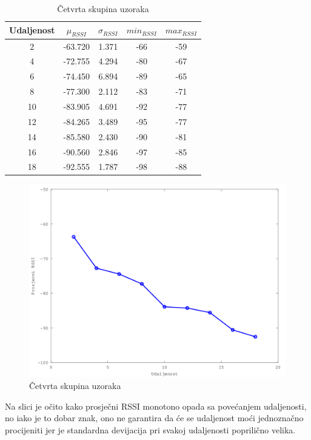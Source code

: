 \begin{table}[H]
    \centering
    \caption{Četvrta skupina uzoraka}
    \label{tbl:velikaUdaljenost}
    \begin{tabular}{ccccc}
    \hline 
    Udaljenost & $\mu_{RSSI}$ & $\sigma_{RSSI}$ & $min_{RSSI}$ & $max_{RSSI}$ \\ 
    \hline 
    2 & -63.720 & 1.371 & -66 & -59 \\ 
    4 & -72.755 & 4.294 & -80 & -67 \\ 
    6 & -74.450 & 6.894 & -89 & -65 \\ 
    8 & -77.300 & 2.112 & -83 & -71 \\ 
    10 & -83.905 & 4.691 & -92 & -77 \\ 
    12 & -84.265 & 3.489 & -95 & -77 \\ 
    14 & -85.580 & 2.430 & -90 & -81 \\ 
    16 & -90.560 & 2.846 & -97 & -85 \\ 
    18 & -92.555 & 1.787 & -98 & -88 \\ 
    \hline 
    \end{tabular} 
\end{table}

\begin{figure}[H]
    \centering
    \includegraphics[scale=0.62]{pictures/cetvrta-skupina-uzoraka}
    \caption{Četvrta skupina uzoraka}
    \label{fig:velikaUdaljenost}
\end{figure}

Na slici je očito kako prosječni RSSI monotono opada sa povećanjem udaljenosti, no iako je to dobar znak, ono ne garantira da će se udaljenost moći jednoznačno procijeniti jer je standardna devijacija pri svakoj udaljenosti poprilično velika.
\\

